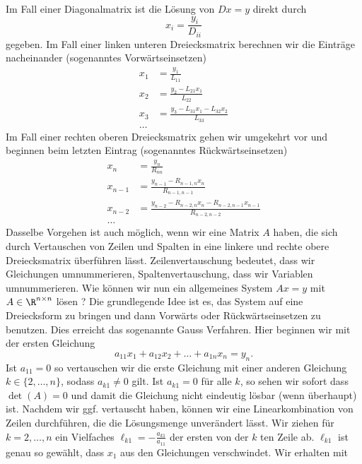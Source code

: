 \documentclass[letterpaper,10pt,english]{jupyterBook}
\begin{document}
Im Fall einer Diagonalmatrix ist die Lösung von \(Dx = y\) direkt durch
\begin{equation*}
 x_i = \frac{y_i}{D_{ii}}
\end{equation*}
gegeben. Im Fall einer linken unteren Dreiecksmatrix berechnen wir die Einträge nacheinander (sogenanntes Vorwärtseinsetzen)
\begin{align*}
x_1 &= \frac{y_1}{L_{11}} \\
x_2 &= \frac{y_2-L_{21} x_1}{L_{22}} \\
x_3 &= \frac{y_3-L_{31} x_1-L_{32} x_2}{L_{33}} \\
\ldots
\end{align*}
Im Fall einer rechten oberen Dreiecksmatrix gehen wir umgekehrt vor und beginnen beim letzten Eintrag (sogenanntes Rückwärtseinsetzen)
\begin{align*}
x_n &= \frac{y_n}{R_{nn}} \\
x_{n-1} &= \frac{y_{n-1}-R_{n-1,n} x_n}{R_{n-1,n-1}} \\
x_{n-2} &= \frac{y_{n-2}-R_{n-2,n} x_n-R_{n-2,n-1} x_{n-1}}{R_{n-2,n-2}} \\
\ldots
\end{align*}
Dasselbe Vorgehen ist auch möglich, wenn wir eine Matrix \(A\) haben, die sich durch Vertauschen von Zeilen und Spalten in eine linkere und rechte obere Dreiecksmatrix überführen lässt. Zeilenvertauschung bedeutet, dass wir Gleichungen umnummerieren, Spaltenvertauschung, dass wir Variablen umnummerieren.
Wie können wir nun ein allgemeines System \(Ax = y\) mit \(A \in \R^{n \times n}\) lösen ? Die grundlegende Idee ist es, das System auf eine Dreiecksform zu bringen und dann Vorwärts  oder Rückwärtseinsetzen zu benutzen. Dies erreicht das sogenannte Gauss Verfahren. Hier beginnen wir mit der ersten Gleichung
\begin{equation*}
 a_{11}x_1 + a_{12} x_2 + \ldots + a_{1n} x_n = y_n.
\end{equation*}
Ist \(a_{11}=0\) so vertauschen wir die erste Gleichung mit einer anderen Gleichung \(k \in \{2,\ldots,n\}\), sodass \(a_{k1} \neq 0\) gilt. Ist \(a_{k1}=0\) für alle \(k\), so sehen wir sofort dass \(\det(A)=0\) und damit die Gleichung nicht eindeutig lösbar (wenn überhaupt) ist.  Nachdem wir ggf. vertauscht haben, können wir eine Linearkombination von Zeilen durchführen, die die Lösungsmenge unverändert lässt. Wir ziehen für \(k=2,\ldots,n\) ein Vielfaches \(\ell_{k1} = - \frac{a_{k1}}{a_{11}}\) der ersten von der \(k\) ten Zeile ab. \(\ell_{k1}\) ist genau so gewählt, dass \(x_1\) aus den Gleichungen verschwindet. Wir erhalten mit
\end{document}
